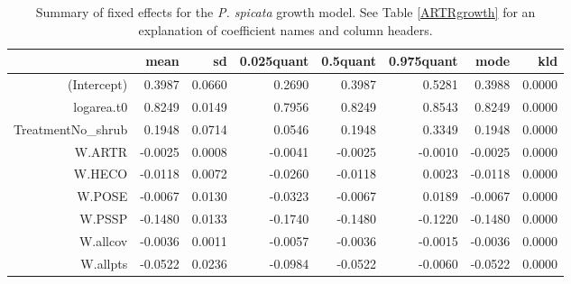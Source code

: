 \documentclass[11pt]{article}
\begin{document}
\begin{table}[ht]
\centering
\caption{Summary of fixed effects for the \textit{P. spicata} growth model. See Table \ref{ARTRgrowth} for an explanation of coefficient names
and column headers.} 
\label{PSSPgrowth}
\begin{tabular}{rrrrrrrr}
  \hline
 & mean & sd & 0.025quant & 0.5quant & 0.975quant & mode & kld \\ 
  \hline
(Intercept) & 0.3987 & 0.0660 & 0.2690 & 0.3987 & 0.5281 & 0.3988 & 0.0000 \\ 
  logarea.t0 & 0.8249 & 0.0149 & 0.7956 & 0.8249 & 0.8543 & 0.8249 & 0.0000 \\ 
  TreatmentNo\_shrub & 0.1948 & 0.0714 & 0.0546 & 0.1948 & 0.3349 & 0.1948 & 0.0000 \\ 
  W.ARTR & -0.0025 & 0.0008 & -0.0041 & -0.0025 & -0.0010 & -0.0025 & 0.0000 \\ 
  W.HECO & -0.0118 & 0.0072 & -0.0260 & -0.0118 & 0.0023 & -0.0118 & 0.0000 \\ 
  W.POSE & -0.0067 & 0.0130 & -0.0323 & -0.0067 & 0.0189 & -0.0067 & 0.0000 \\ 
  W.PSSP & -0.1480 & 0.0133 & -0.1740 & -0.1480 & -0.1220 & -0.1480 & 0.0000 \\ 
  W.allcov & -0.0036 & 0.0011 & -0.0057 & -0.0036 & -0.0015 & -0.0036 & 0.0000 \\ 
  W.allpts & -0.0522 & 0.0236 & -0.0984 & -0.0522 & -0.0060 & -0.0522 & 0.0000 \\ 
   \hline
\end{tabular}
\end{table}
\end{document}
